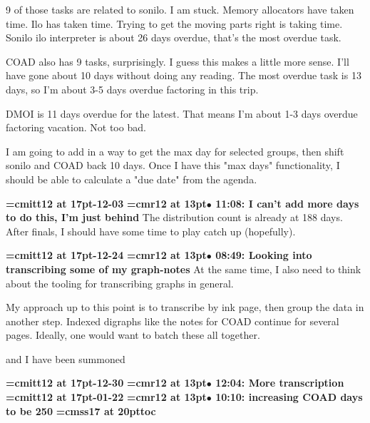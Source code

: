 9 of those tasks are related to sonilo. I am stuck. Memory allocators have taken time. Ilo has taken time. Trying to get the moving parts right is taking time. Sonilo ilo interpreter is about 26 days overdue, that's the most overdue task.
\par

COAD also has 9 tasks, surprisingly. I guess this makes a little more sense. I'll have gone about 10 days without doing any reading. The most overdue task is 13 days, so I'm about 3-5 days overdue factoring in this trip.
\par

DMOI is 11 days overdue for the latest. That means I'm about 1-3 days overdue factoring vacation. Not too bad.
\par

I am going to add in a way to get the max day for selected groups, then shift sonilo and COAD back 10 days. Once I have this "max days" functionality, I should be able to calculate a "due date" from the agenda.
\par

{\medskip\noindent\bf\font\titlefont=cmitt12 at 17pt-12-03}\medskip
{\smallskip\noindent\bf\font\titlefont=cmr12 at 13pt\titlefont $\bullet$ 11:08: I can't add more days to do this, I'm just behind}\smallskip
The distribution count is already at 188 days. After finals, I should have some time to play catch up (hopefully).
\par

{\medskip\noindent\bf\font\titlefont=cmitt12 at 17pt-12-24}\medskip
{\smallskip\noindent\bf\font\titlefont=cmr12 at 13pt\titlefont $\bullet$ 08:49: Looking into transcribing some of my graph-notes}\smallskip
At the same time, I also need to think about the tooling for transcribing graphs in general.
\par

My approach up to this point is to transcribe by ink page, then group the data in another step. Indexed digraphs like the notes for COAD continue for several pages. Ideally, one would want to batch these all together.
\par

and I have been summoned
\par

{\medskip\noindent\bf\font\titlefont=cmitt12 at 17pt-12-30}\medskip
{\smallskip\noindent\bf\font\titlefont=cmr12 at 13pt\titlefont $\bullet$ 12:04: More transcription}\smallskip
{\medskip\noindent\bf\font\titlefont=cmitt12 at 17pt-01-22}\medskip
{\smallskip\noindent\bf\font\titlefont=cmr12 at 13pt\titlefont $\bullet$ 10:10: increasing COAD days to be 250}\smallskip
{}
{\medskip\noindent\bf\font\titlefont=cmss17 at 20pt\titlefont toc}\medskip

